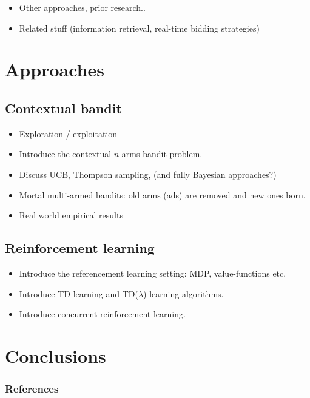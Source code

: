 \documentclass{article} %
\begin{document}
\begin{itemize}
  \item
  Other approaches, prior research..
  \item
  Related stuff (information retrieval, real-time bidding strategies)
\end{itemize}

\section{Approaches}

\subsection{Contextual bandit}

\begin{itemize}
  \item{Exploration / exploitation}
  \item{Introduce the contextual $n$-arms bandit problem.}
  \item{Discuss UCB, Thompson sampling, (and fully Bayesian approaches?)}
  \item{Mortal multi-armed bandits: old arms (ads) are removed and new ones
    born.}
  \item{Real world empirical results}
\end{itemize}

\subsection{Reinforcement learning}

\begin{itemize}
  \item{Introduce the referencement learning setting: MDP, value-functions
    etc.}
  \item{Introduce TD-learning and TD($\lambda$)-learning algorithms.}
  \item{Introduce concurrent reinforcement learning.}
\end{itemize}

\section{Conclusions}

\subsubsection*{References}
\nocite{*}

\printbibliography[heading=none]
\end{document}
